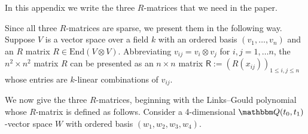 \documentclass[12pt,reqno]{amsart}
\theoremstyle{definition}
\def\BQ{\mathbbm Q}
\def\be{\begin{equation}}
\def\ee{\end{equation}}
\def\End{\mathrm{End}}
\def\LG{\mathrm{LG}}
\begin{document}
In this appendix we write the three $R$-matrices that we need in the paper.

Since all three $R$-matrices are sparse, we present them in the following way.
Suppose $V$ is a vector space over a field $k$ with an ordered basis
$(v_1,\dots,v_n)$ and an $R$ matrix $R \in \End(V \otimes V)$.
Abbreviating $v_{ij}=v_i \otimes v_j$ for $i,j=1,\dots n$, the $n^2 \times n^2$
matrix $R$ can be presented
as an $n \times n$ matrix $\mathsf{R}:=(R(x_{ij}))_{1 \leq i,j \leq n}$ whose
entries are $k$-linear combinations of $v_{ij}$.

We now give the three $R$-matrices, beginning 
with the Links--Gould polynomial whose $R$-matrix is defined as follows.
Consider a 4-dimensional $\BQ(t_0,t_1)$-vector space $W$ with ordered basis
$(w_1,w_2,w_3,w_4)$.
%
\end{document}
